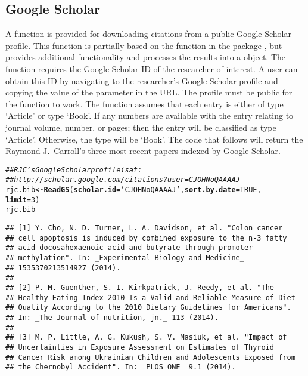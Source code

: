\documentclass[article]{jss}\usepackage[]{graphicx}\usepackage[]{color}
\makeatletter
\newcommand{\hlnum}[1]{\textcolor[rgb]{0.125,0.125,1}{#1}}%
\newcommand{\hlstr}[1]{\textcolor[rgb]{0.125,0.125,1}{#1}}%
\newcommand{\hlcom}[1]{\textcolor[rgb]{1,0,0.753}{\textit{#1}}}%
\newcommand{\hlstd}[1]{\textcolor[rgb]{0.251,0.251,0.282}{#1}}%
\newcommand{\hlkwb}[1]{\textcolor[rgb]{0.439,0.251,1}{\textbf{#1}}}%
\newcommand{\hlkwc}[1]{\textcolor[rgb]{0.529,0,0.184}{\textbf{#1}}}%
\newcommand{\hlkwd}[1]{\textcolor[rgb]{0.251,0.251,0.282}{\textbf{#1}}}%
\newenvironment{kframe}{%
 \def\at@end@of@kframe{}%
 \ifinner\ifhmode%
  \def\at@end@of@kframe{\end{minipage}}%
  \begin{minipage}{\columnwidth}%
 \fi\fi%
 \def\FrameCommand##1{\hskip\@totalleftmargin \hskip-\fboxsep
 \colorbox{shadecolor}{##1}\hskip-\fboxsep
     \hskip-\linewidth \hskip-\@totalleftmargin \hskip\columnwidth}%
 \MakeFramed {\advance\hsize-\width
   \@totalleftmargin\z@ \linewidth\hsize
   \@setminipage}}%
 {\par\unskip\endMakeFramed%
 \at@end@of@kframe}
\newenvironment{knitrout}{}{} %
\makeatother
\begin{document}
\subsection{Google Scholar}
A function is provided for downloading citations from a public Google Scholar profile.  This function is partially based on the function  in the  package \citep{scholar}, but provides additional functionality and processes the results into a  object.  The function requires the Google Scholar ID of the researcher of interest.  A user can obtain this ID by navigating to the researcher's Google Scholar profile and copying the value of the  parameter in the URL.  The profile must be public for the function to work.  The function assumes that each entry is either of type `Article' or type `Book'.  If any numbers are available with the entry relating to journal volume, number, or pages; then the entry will be classified as type `Article'.  Otherwise, the type will be `Book'.  The code that follows will return the Raymond J.\ Carroll's three most recent papers indexed by Google Scholar.
\begin{knitrout}
\color{fgcolor}\begin{kframe}
\begin{alltt}
\hlcom{## RJC's Google Scholar profile is at: }
\hlcom{## http://scholar.google.com/citations?user=CJOHNoQAAAAJ}
\hlstd{rjc.bib} \hlkwb{<-} \hlkwd{ReadGS}\hlstd{(}\hlkwc{scholar.id} \hlstd{=} \hlstr{'CJOHNoQAAAAJ'}\hlstd{,} \hlkwc{sort.by.date} \hlstd{=} \hlnum{TRUE}\hlstd{,}
                  \hlkwc{limit} \hlstd{=} \hlnum{3}\hlstd{)}
\hlstd{rjc.bib}
\end{alltt}
\begin{verbatim}
## [1] Y. Cho, N. D. Turner, L. A. Davidson, et al. "Colon cancer
## cell apoptosis is induced by combined exposure to the n-3 fatty
## acid docosahexaenoic acid and butyrate through promoter
## methylation". In: _Experimental Biology and Medicine_
## 1535370213514927 (2014).
## 
## [2] P. M. Guenther, S. I. Kirkpatrick, J. Reedy, et al. "The
## Healthy Eating Index-2010 Is a Valid and Reliable Measure of Diet
## Quality According to the 2010 Dietary Guidelines for Americans".
## In: _The Journal of nutrition, jn._ 113 (2014).
## 
## [3] M. P. Little, A. G. Kukush, S. V. Masiuk, et al. "Impact of
## Uncertainties in Exposure Assessment on Estimates of Thyroid
## Cancer Risk among Ukrainian Children and Adolescents Exposed from
## the Chernobyl Accident". In: _PLOS ONE_ 9.1 (2014).
\end{verbatim}
\end{kframe}
\end{knitrout}
\end{document}

